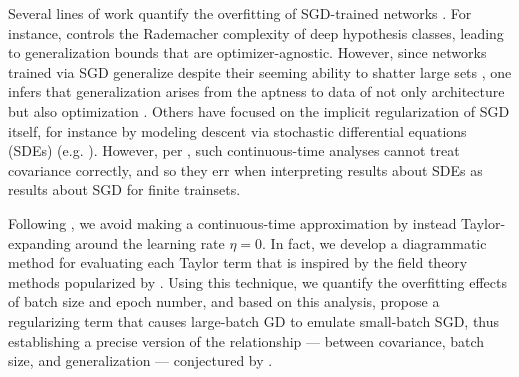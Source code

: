 \documentclass{article}
\begin{document}

    Several lines of work quantify the overfitting of SGD-trained networks
    \citep{ne17a}.  For instance, \citet{ba17} controls the Rademacher
    complexity of deep hypothesis classes, leading to generalization bounds
    that are optimizer-agnostic.  However, since networks trained via SGD
    generalize despite their seeming ability to shatter large sets
    \citep{zh17}, one infers that generalization arises from the aptness to
    data of not only architecture but also optimization \citep{ne17b}.  Others
    have focused on the implicit regularization of SGD itself, for instance by
    modeling descent via stochastic differential equations (SDEs) (e.g.
    \citet{ch18}).  However, per \citet{ya19a}, such continuous-time analyses
    cannot treat covariance correctly, and so they err when interpreting
    results about SDEs as results about SGD for finite trainsets.


    Following
    \citet{ro18}, we avoid making a continuous-time
    approximation by instead Taylor-expanding around the learning rate
    $\eta=0$.  In fact, we develop a diagrammatic method for evaluating each
    Taylor term that is inspired by the field theory methods popularized by
    \citet{dy49a}.  Using this technique, we quantify the overfitting effects
    of batch size and epoch number, and based on this analysis, propose a
    regularizing term that causes large-batch GD to emulate small-batch SGD,
    thus establishing a precise version of the relationship --- between
    covariance, batch size, and generalization --- conjectured by \citet{ja18}.  
    
\end{document}
